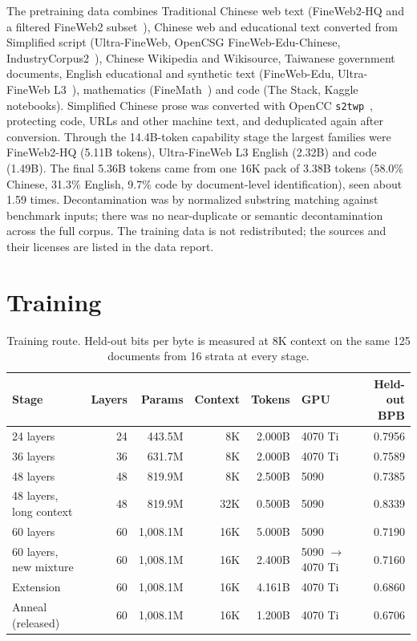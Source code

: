\documentclass[11pt]{article}
\begin{document}
The pretraining data combines Traditional Chinese web text (FineWeb2-HQ and a filtered FineWeb2
subset~\cite{fineweb2hq2025}), Chinese web and educational text converted from Simplified script (Ultra-FineWeb,
OpenCSG FineWeb-Edu-Chinese, IndustryCorpus2~\cite{ultrafineweb2025}), Chinese Wikipedia and Wikisource,
Taiwanese government documents, English educational and synthetic text (FineWeb-Edu, Ultra-FineWeb
L3~\cite{fineweb2024,ultrafineweb2025}), mathematics (FineMath~\cite{smollm2}) and code (The Stack, Kaggle
notebooks). Simplified Chinese prose was converted with OpenCC \texttt{s2twp}~\cite{opencc}, protecting code,
URLs and other machine text, and deduplicated again after conversion. Through the 14.4B-token capability stage
the largest families were FineWeb2-HQ (5.11B tokens), Ultra-FineWeb L3 English (2.32B) and code (1.49B). The
final 5.36B tokens came from one 16K pack of 3.38B tokens (58.0\% Chinese, 31.3\% English, 9.7\% code by
document-level identification), seen about 1.59 times. Decontamination was by normalized substring matching
against benchmark inputs; there was no near-duplicate or semantic decontamination across the full corpus. The
training data is not redistributed; the sources and their licenses are listed in the data report.

\section{Training}\label{sec:train}

\begin{table}[t]
\centering\small
\caption{Training route. Held-out bits per byte is measured at 8K context on the same 125 documents from 16
strata at every stage.}\label{tab:route}
\begin{tabular}{@{}lrrrrlr@{}}
\toprule
Stage & Layers & Params & Context & Tokens & GPU & Held-out BPB \\
\midrule
24 layers & 24 & 443.5M & 8K & 2.000B & 4070 Ti & 0.7956 \\
36 layers & 36 & 631.7M & 8K & 2.000B & 4070 Ti & 0.7589 \\
48 layers & 48 & 819.9M & 8K & 2.500B & 5090 & 0.7385 \\
48 layers, long context & 48 & 819.9M & 32K & 0.500B & 5090 & 0.8339 \\
60 layers & 60 & 1,008.1M & 16K & 5.000B & 5090 & 0.7190 \\
60 layers, new mixture & 60 & 1,008.1M & 16K & 2.400B & 5090 $\rightarrow$ 4070 Ti & 0.7160 \\
Extension & 60 & 1,008.1M & 16K & 4.161B & 4070 Ti & 0.6860 \\
Anneal (released) & 60 & 1,008.1M & 16K & 1.200B & 4070 Ti & 0.6706 \\
\bottomrule
\end{tabular}
\end{table}
\end{document}
